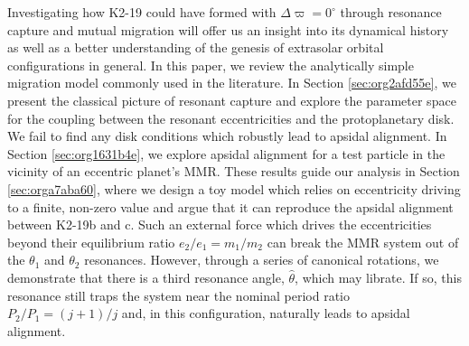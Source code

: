 \documentclass[usenatbib,twocolumn]{mnras}
\begin{document}
Investigating how K2-19 could have formed with \(\Delta\varpi=0^\circ\)
through resonance capture and mutual migration will offer us an
insight into its dynamical history as well as a better understanding
of the genesis of extrasolar orbital configurations in general.  In
this paper, we review the analytically simple migration model commonly
used in the literature.  In Section \ref{sec:org2afd55e}, we present the classical picture of resonant capture and
explore the parameter space for the coupling between the resonant
eccentricities and the protoplanetary disk. We fail to find any disk
conditions which robustly lead to apsidal alignment.  In Section \ref{sec:org1631b4e}, we explore apsidal alignment for a test particle in
the vicinity of an eccentric planet's MMR. These results guide our
analysis in Section \ref{sec:orga7aba60}, where we design a toy model which
relies on eccentricity driving to a finite, non-zero value and argue
that it can reproduce the apsidal alignment between K2-19b and c.
Such an external force which drives the eccentricities beyond their
equilibrium ratio \(e_2/e_1 = m_1/m_2\) can
break the MMR system out of the \(\theta_1\) and \(\theta_2\) resonances.
However, through a series of canonical rotations, we demonstrate that
there is a third resonance angle, \(\hat\theta\), which may
librate.  If so, this resonance still traps the system near the nominal
period ratio \(P_2/P_1=(j+1)/j\) and, in this configuration, naturally
leads to apsidal alignment.
\end{document}
